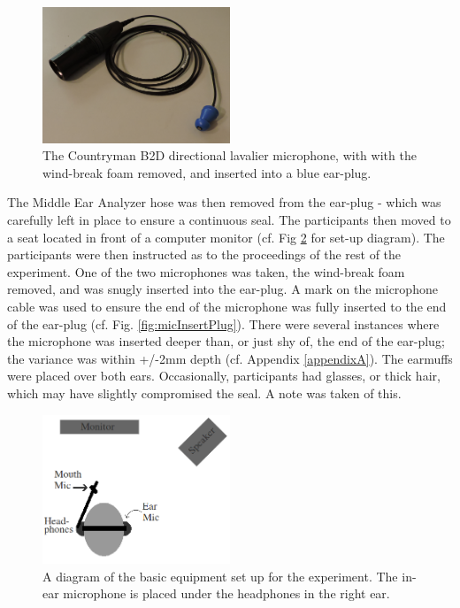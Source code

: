 \begin{figure}
\includegraphics[width=0.5\textwidth]{figure/micInsertPlug.JPG}
\caption{The Countryman B2D directional lavalier microphone, with with the wind-break foam removed, and inserted into a blue ear-plug.}
\label{fig:earmuffSetup}
\end{figure}

The Middle Ear Analyzer hose was then removed from the ear-plug - which was carefully left in place to ensure a continuous seal.  The participants then moved to a seat located in front of a computer monitor (cf. Fig \ref{fig:overallSetUp} for set-up diagram).  The participants were then instructed as to the proceedings of the rest of the experiment. One of the two microphones was taken, the wind-break foam removed, and was snugly inserted into the ear-plug.  A mark on the microphone cable was used to ensure the end of the microphone was fully inserted to the end of the ear-plug (cf. Fig. \ref{fig:micInsertPlug}).  There were several instances where the microphone was inserted deeper than, or just shy of, the end of the ear-plug; the variance was within +/-2mm depth (cf. Appendix \DIFdelbegin {}\DIFdelend \ref{appendixA}).  The earmuffs were placed over both ears.  Occasionally, participants had glasses, or thick hair, which may have slightly compromised the seal.  A note was taken of this. \DIFaddbegin {}\DIFaddend 

\begin{figure}
\includegraphics[width=0.5\textwidth]{figure/overallSetUp.png}
\caption{A diagram of the basic equipment set up for the experiment.  The in-ear microphone is placed under the headphones in the right ear.}
\label{fig:overallSetUp}
\end{figure}

